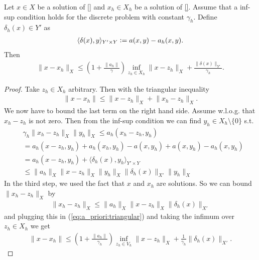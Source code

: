 \documentclass[../master_thesis.tex]{subfiles}
\begin{document}
\begin{lemma}
    Let $x \in X$ be a solution of \ref{} and $x_h \in X_h$ be a solution of \ref{}.
    Assume that a inf-sup condition holds for the discrete problem with constant 
    $\gamma_h$.
    Define $\delta_h(x) \in Y'$ as 
    \begin{align*}
        \langle \delta(x), y \rangle_{Y'\times Y} 
        \vcentcolon= a(x,y) - a_h(x,y).
    \end{align*}
    Then
    \begin{align*}
        \lVert x - x_h \rVert _X 
        \leq \left( 1 + \frac{\lVert a_h \rVert}{\gamma} \right) 
            \inf_{z_h \in X_h} \lVert x - z_h\rVert _X + \frac{\lVert \delta(x) \rVert_{Y'}}{\gamma_h}.
    \end{align*}
\end{lemma}
\begin{proof}
    Take $z_h \in X_h$ arbitrary. Then with the triangular inequality
    \begin{align}
        \lVert x - x_h \rVert \leq \lVert x - z_h \rVert _X + \lVert x_h - z_h \rVert _X. \label{eq:a_priori:triangular}
    \end{align}
    We now have to bound the last term on the right hand side.
    Assume w.l.o.g. that $x_h - z_h$ is not zero. Then from the inf-sup condition 
    we can find $y_h \in X_h \setminus \{0\}$ s.t. 
    \begin{align*}
        &\gamma_h \lVert x_h - z_h \rVert _X \lVert y_h \rVert _X
        \leq a_h(x_h-z_h, y_h) 
        \\ &= a_h(x-z_h, y_h) + a_h(x_h, y_h) - a(x, y_h) + a(x, y_h) - a_h(x, y_h) 
        \\ &= a_h(x-z_h, y_h) + \langle \delta_h(x), y_h \rangle_{Y'\times Y} 
        \\ &\leq \lVert a_h \rVert _X \lVert x- z_h \rVert _X \lVert y_h \rVert _X
            \lVert \delta_h(x) \rVert _{X'}  \lVert y_h \rVert _X
    \end{align*}
    In the third step, we used the fact that $x$ and $x_h$ are solutions.
    So we can bound $\lVert x_h - z_h \rVert _X$ by 
    \begin{align*}
        \lVert x_h - z_h \rVert _X
        \leq \lVert a_h \rVert _X \lVert x- z_h \rVert _X 
            \lVert \delta_h(x) \rVert _{X'}  
    \end{align*}
    and plugging this in (\ref{eq:a_priori:triangular}) and taking the infimum 
    over $z_h \in X_h$ we get 
    \begin{align*}
        \lVert x - x_h \rVert 
        \leq \left( 1 + \frac{\lVert a_h \rVert}{\gamma_h} \right) \inf _{z_h \in V_h}\lVert x - z_h \rVert _X 
            + \frac{1}{\gamma_h}\lVert \delta_h(x) \rVert _{X'}.
    \end{align*}
\end{proof}
\end{document}
